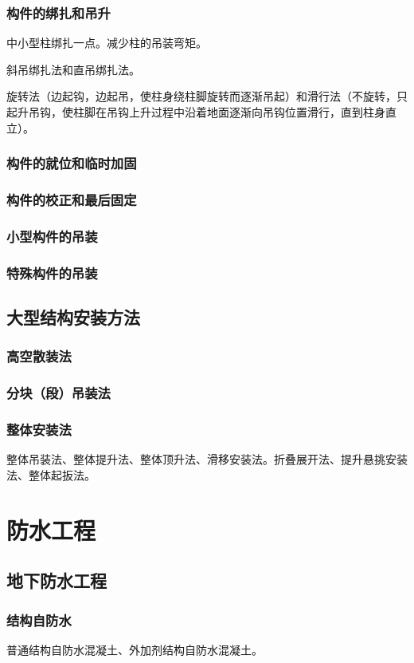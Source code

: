 \documentclass{book}
\begin{document}
\subsection{构件的绑扎和吊升}
\par 中小型柱绑扎一点。减少柱的吊装弯矩。
\par 斜吊绑扎法和直吊绑扎法。
\par 旋转法（边起钩，边起吊，使柱身绕柱脚旋转而逐渐吊起）和滑行法（不旋转，只起升吊钩，使柱脚在吊钩上升过程中沿着地面逐渐向吊钩位置滑行，直到柱身直立）。
\subsection{构件的就位和临时加固}
\subsection{构件的校正和最后固定}
\subsection{小型构件的吊装}
\subsection{特殊构件的吊装}
\section{大型结构安装方法}
\subsection{高空散装法}
\subsection{分块（段）吊装法}
\subsection{整体安装法}
\par 整体吊装法、整体提升法、整体顶升法、滑移安装法。折叠展开法、提升悬挑安装法、整体起扳法。
\chapter{防水工程}
\section{地下防水工程}
\subsection{结构自防水}
\par 普通结构自防水混凝土、外加剂结构自防水混凝土。
\end{document}
